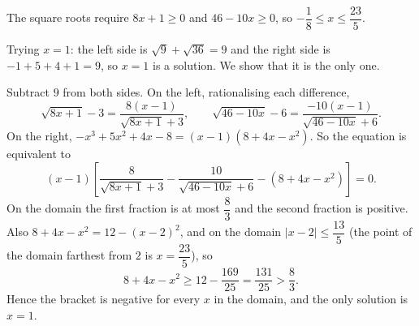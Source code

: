 The square roots require $8x+1\ge0$ and $46-10x\ge0$, so $-\dfrac{1}{8}\le x\le\dfrac{23}{5}$.

Trying $x=1$: the left side is $\sqrt9+\sqrt{36}=9$ and the right side is $-1+5+4+1=9$, so $x=1$ is a solution. We show that it is the only one.

Subtract $9$ from both sides. On the left, rationalising each difference,
\[
\sqrt{8x+1}-3=\dfrac{8(x-1)}{\sqrt{8x+1}+3},\qquad \sqrt{46-10x}-6=\dfrac{-10(x-1)}{\sqrt{46-10x}+6}.
\]
On the right, $-x^3+5x^2+4x-8=(x-1)(8+4x-x^2)$. So the equation is equivalent to
\[
(x-1)\left[\dfrac{8}{\sqrt{8x+1}+3}-\dfrac{10}{\sqrt{46-10x}+6}-\left(8+4x-x^2\right)\right]=0 .
\]
On the domain the first fraction is at most $\dfrac{8}{3}$ and the second fraction is positive. Also $8+4x-x^2=12-(x-2)^2$, and on the domain $|x-2|\le\dfrac{13}{5}$ (the point of the domain farthest from $2$ is $x=\dfrac{23}{5}$), so
\[
8+4x-x^2\ge12-\dfrac{169}{25}=\dfrac{131}{25}>\dfrac{8}{3} .
\]
Hence the bracket is negative for every $x$ in the domain, and the only solution is $x=\boxed{1}$.
